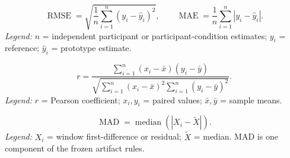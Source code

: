 \documentclass[10pt,conference]{IEEEtran}
\begin{document}
\begin{equation}
\operatorname{RMSE}=\sqrt{\frac{1}{n}\sum_{i=1}^{n}(y_i-\hat y_i)^2},\qquad
\operatorname{MAE}=\frac{1}{n}\sum_{i=1}^{n}|y_i-\hat y_i|.
\end{equation}
\noindent\emph{Legend:} $n$ = independent participant or participant-condition estimates; $y_i$ = reference; $\hat y_i$ = prototype estimate.

\begin{equation}
r=\frac{\sum_{i=1}^{n}(x_i-\bar x)(y_i-\bar y)}{\sqrt{\sum_{i=1}^{n}(x_i-\bar x)^2\sum_{i=1}^{n}(y_i-\bar y)^2}}.
\end{equation}
\noindent\emph{Legend:} $r$ = Pearson coefficient; $x_i,y_i$ = paired values; $\bar x,\bar y$ = sample means.

\begin{equation}
\operatorname{MAD}=\operatorname{median}(|X_i-\widetilde X|).
\end{equation}
\noindent\emph{Legend:} $X_i$ = window first-difference or residual; $\widetilde X$ = median. MAD is one component of the frozen artifact rules.
\end{document}
